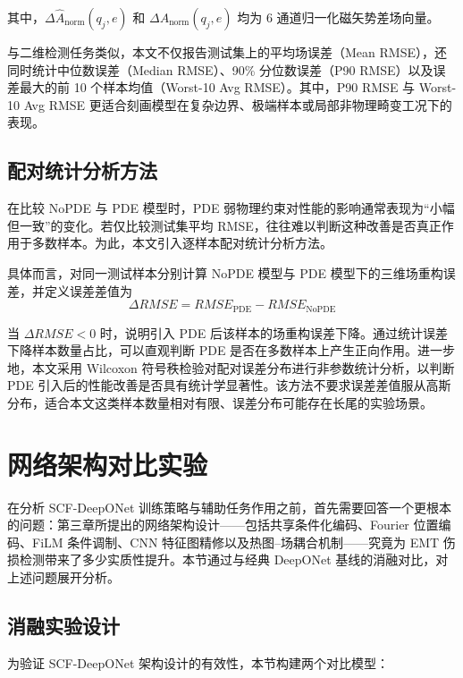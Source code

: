 其中，$\Delta \hat{A}_{\mathrm{norm}}(q_j,e)$ 和
$\Delta A_{\mathrm{norm}}(q_j,e)$ 均为 6 通道归一化磁矢势差场向量。

与二维检测任务类似，本文不仅报告测试集上的平均场误差（Mean RMSE），还同时统计中位数误差（Median RMSE）、90\% 分位数误差（P90 RMSE）以及误差最大的前 10 个样本均值（Worst-10 Avg RMSE）。其中，P90 RMSE 与 Worst-10 Avg RMSE 更适合刻画模型在复杂边界、极端样本或局部非物理畸变工况下的表现。

\subsection{配对统计分析方法}
\label{subsec:statistical_analysis}

在比较 NoPDE 与 PDE 模型时，PDE 弱物理约束对性能的影响通常表现为``小幅但一致''的变化。若仅比较测试集平均 RMSE，往往难以判断这种改善是否真正作用于多数样本。为此，本文引入逐样本配对统计分析方法。

具体而言，对同一测试样本分别计算 NoPDE 模型与 PDE 模型下的三维场重构误差，并定义误差差值为
\begin{equation}
\label{eq:delta_rmse}
\Delta RMSE
=
RMSE_{\mathrm{PDE}}
-
RMSE_{\mathrm{NoPDE}}
\end{equation}

当 $\Delta RMSE<0$ 时，说明引入 PDE 后该样本的场重构误差下降。通过统计误差下降样本数量占比，可以直观判断 PDE 是否在多数样本上产生正向作用。进一步地，本文采用 Wilcoxon 符号秩检验对配对误差分布进行非参数统计分析，以判断 PDE 引入后的性能改善是否具有统计学显著性\citep{wilcoxon1945individual}。该方法不要求误差差值服从高斯分布，适合本文这类样本数量相对有限、误差分布可能存在长尾的实验场景。

\section{网络架构对比实验}
\label{sec:ablation_experiment}

在分析 SCF-DeepONet 训练策略与辅助任务作用之前，首先需要回答一个更根本的问题：第三章所提出的网络架构设计——包括共享条件化编码、Fourier 位置编码、FiLM 条件调制、CNN 特征图精修以及热图--场耦合机制——究竟为 EMT 伤损检测带来了多少实质性提升。本节通过与经典 DeepONet 基线的消融对比，对上述问题展开分析。

\subsection{消融实验设计}
\label{subsec:ablation_design}

为验证 SCF-DeepONet 架构设计的有效性，本节构建两个对比模型：

